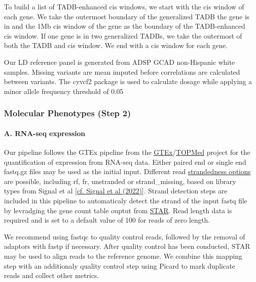 \documentclass[12pt]{article}
\begin{document}
To build a list of TADB-enhanced cis windows, we start with the cis window of each gene. We take the outermost boundary of the generalized TADB the gene is in and the 1Mb cis window of the gene as the boundary of the TADB-enhanced cis window. If one gene is in two generalized TADBs, we take the outermost of both the TADB and cis window. We end with a cis window for each gene.




Our LD reference panel is generated from ADSP GCAD non-Hispanic white samples. Missing variants are mean imputed before correlations are calculated between variants. The cyvcf2 package is used to calculate dosage while applying a minor allele frequency threshold of 0.05%

\subsubsection*{Molecular Phenotypes (Step 2)}

\paragraph*{A.  RNA-seq expression}


Our pipeline follows the GTEx pipeline from the \href{https://gtexportal.org/home/aboutGTEx#staticTextAnalysisMethods}{GTEx}/\href{https://github.com/broadinstitute/gtex-pipeline/blob/master/TOPMed\\_RNAseq\\_pipeline.md}{TOPMed} project for the quantification of expression from RNA-seq data. Either paired end or single end fastq.gz files may be used as the initial input. Different read \href{https://rnabio.org/module-09-appendix/0009/12/01/StrandSettings/}{strandedness options} are possible, including rf, fr, unstranded or strand\_missing, based on library types from Signal et al \href{https://doi.org/10.1186/s12859-022-04572-7}{[cf. Signal et al (2022)}]. Strand detection steps are included in this pipeline to automaticaly detect the strand of the input fastq file by levradging the gene count table ouptut from \href{https://physiology.med.cornell.edu/faculty/skrabanek/lab/angsd/lecture\\_notes/STARmanual.pdf}{STAR}. Read length data is required and is set to a default value of 100 for reads of zero length.



We recommend using fastqc to quality control reads, followed by the removal of adaptors with fastp if necessary. After quality control has been conducted, STAR may be used to align reads to the reference genome. We combine this mapping step with an additionaly quality control step using Picard to mark duplicate reads and collect other metrics.
\end{document}
